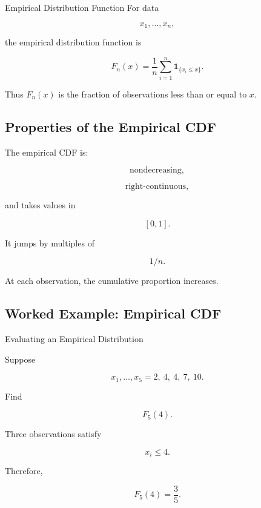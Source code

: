 \begin{definitionbox}{Empirical Distribution Function}
For data

\[
x_1,\ldots,x_n,
\]

the empirical distribution function is

\[
\boxed{
F_n(x)
=
\frac1n
\sum_{i=1}^{n}
\mathbf{1}_{\{x_i\leq x\}}.
}
\]
\end{definitionbox}

Thus \(F_n(x)\) is the fraction of observations less than or equal to
\(x\).

\subsection{Properties of the Empirical CDF}
\label{subsec:empirical-cdf-properties}

The empirical CDF is:

\[
\boxed{
\text{nondecreasing},
}
\]

\[
\boxed{
\text{right-continuous},
}
\]

and takes values in

\[
[0,1].
\]

It jumps by multiples of

\[
1/n.
\]

At each observation, the cumulative proportion increases.

\subsection{Worked Example: Empirical CDF}
\label{subsec:worked-empirical-cdf}

\begin{workedexamplebox}{Evaluating an Empirical Distribution}

Suppose

\[
x_1,\ldots,x_5
=
2,\ 4,\ 4,\ 7,\ 10.
\]

Find

\[
F_5(4).
\]

Three observations satisfy

\[
x_i\leq4.
\]

Therefore,

\begin{answerbox}
\[
\boxed{
F_5(4)
=
\frac35.
}
\]
\end{answerbox}

\end{workedexamplebox}


